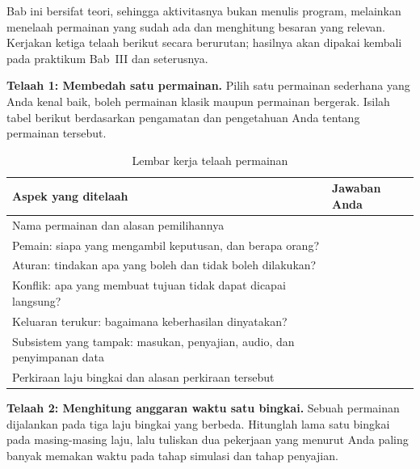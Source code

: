 
Bab ini bersifat teori, sehingga aktivitasnya bukan menulis program,
melainkan menelaah permainan yang sudah ada dan menghitung besaran yang
relevan. Kerjakan ketiga telaah berikut secara berurutan; hasilnya akan
dipakai kembali pada praktikum Bab~III dan seterusnya.

\begin{aktivitasbox}
\textbf{Telaah 1: Membedah satu permainan.} Pilih satu permainan sederhana
yang Anda kenal baik, boleh permainan klasik maupun permainan bergerak.
Isilah tabel berikut berdasarkan pengamatan dan pengetahuan Anda tentang
permainan tersebut.
\end{aktivitasbox}

\begin{table}[htbp]
\centering
\caption{Lembar kerja telaah permainan}
\label{tab:lembar-telaah}
{\setlength{\tabcolsep}{4pt}\footnotesize%
\begin{tabularx}{\textwidth}{@{}L{4.5cm} Y@{}}
\toprule
\headrow \textbf{Aspek yang ditelaah} & \textbf{Jawaban Anda} \\
\midrule
Nama permainan dan alasan pemilihannya & \\[1.4em]
\addlinespace
Pemain: siapa yang mengambil keputusan, dan berapa orang? & \\[1.4em]
\addlinespace
Aturan: tindakan apa yang boleh dan tidak boleh dilakukan? & \\[2.2em]
\addlinespace
Konflik: apa yang membuat tujuan tidak dapat dicapai langsung? & \\[1.8em]
\addlinespace
Keluaran terukur: bagaimana keberhasilan dinyatakan? & \\[1.4em]
\addlinespace
Subsistem yang tampak: masukan, penyajian, audio, dan penyimpanan data &
\\[1.8em]
\addlinespace
Perkiraan laju bingkai dan alasan perkiraan tersebut & \\[1.4em]
\bottomrule
\end{tabularx}}
\end{table}

\begin{aktivitasbox}
\textbf{Telaah 2: Menghitung anggaran waktu satu bingkai.} Sebuah permainan
dijalankan pada tiga laju bingkai yang berbeda. Hitunglah lama satu bingkai
pada masing-masing laju, lalu tuliskan dua pekerjaan yang menurut Anda paling
banyak memakan waktu pada tahap simulasi dan tahap penyajian.
\end{aktivitasbox}

